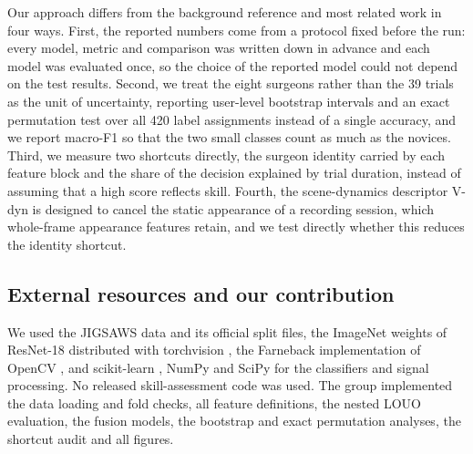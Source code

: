 Our approach differs from the background reference and most related work in four ways. First, the reported numbers come from a protocol fixed before the run: every model, metric and comparison was written down in advance and each model was evaluated once, so the choice of the reported model could not depend on the test results. Second, we treat the eight surgeons rather than the 39 trials as the unit of uncertainty, reporting user-level bootstrap intervals and an exact permutation test over all 420 label assignments instead of a single accuracy, and we report macro-F1 so that the two small classes count as much as the novices. Third, we measure two shortcuts directly, the surgeon identity carried by each feature block and the share of the decision explained by trial duration, instead of assuming that a high score reflects skill. Fourth, the scene-dynamics descriptor V-dyn is designed to cancel the static appearance of a recording session, which whole-frame appearance features retain, and we test directly whether this reduces the identity shortcut.

\subsection{External resources and our contribution}

We used the JIGSAWS data and its official split files, the ImageNet weights of ResNet-18 distributed with torchvision \citep{paszke2019pytorch}, the Farneback implementation of OpenCV \citep{bradski2000opencv}, and scikit-learn \citep{pedregosa2011sklearn}, NumPy \citep{harris2020numpy} and SciPy \citep{virtanen2020scipy} for the classifiers and signal processing. No released skill-assessment code was used. The group implemented the data loading and fold checks, all feature definitions, the nested LOUO evaluation, the fusion models, the bootstrap and exact permutation analyses, the shortcut audit and all figures.
